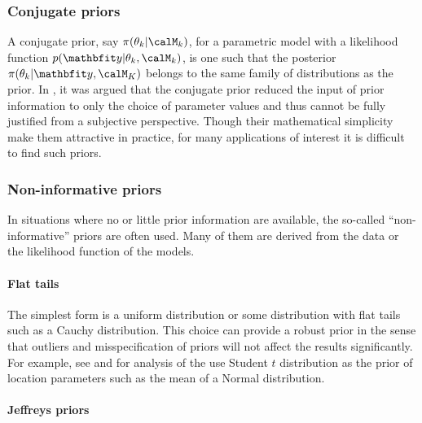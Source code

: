 \subsubsection{Conjugate priors}
\label{ssub:Conjugate priors}

A conjugate prior, say $\pi(\theta_k|\calM_k)$, for a parametric model with a
likelihood function $p(\data|\theta_k,\calM_k)$, is one such that the
posterior $\pi(\theta_k|\data,\calM_K)$ belongs to the same family of
distributions as the prior. In \cite[][sec.~5.2]{Bernardo:1994vd}, it was
argued that the conjugate prior reduced the input of prior information to only
the choice of parameter values and thus cannot be fully justified from a
subjective perspective. Though their mathematical simplicity make them
attractive in practice, for many applications of interest it is difficult to
find such priors.

\subsubsection{Non-informative priors}
\label{ssub:Non-informative priors}

In situations where no or little prior information are available, the
so-called ``non-informative'' priors are often used. Many of them are derived
from the data or the likelihood function of the models.

\paragraph{Flat tails}

The simplest form is a uniform distribution or some distribution with flat
tails such as a Cauchy distribution. This choice can provide a robust prior in
the sense that outliers and misspecification of priors will not affect the
results significantly. For example, see \cite{OHagan:1990vx} and
\cite{Fan:1992vx} for analysis of the use Student $t$ distribution as the
prior of location parameters such as the mean of a Normal distribution.

\paragraph{Jeffreys priors}


